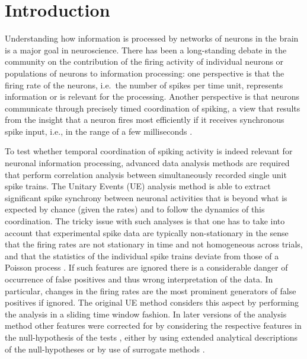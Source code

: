 \documentclass[10pt,a4paper,onecolumn]{article}
\begin{document}
\section{Introduction}\label{introduction}

Understanding how information is processed by networks of neurons in the
brain is a major goal in neuroscience. There has been a long-standing
debate in the community on the contribution of the firing activity of
individual neurons or populations of neurons to information processing:
one perspective is that the firing rate of the neurons, i.e.~the number
of spikes per time unit, represents information or is relevant for the
processing. Another perspective is that neurons communicate through
precisely timed coordination of spiking, a view that results from the
insight that a neuron fires most efficiently if it receives synchronous
spike input, i.e., in the range of a few milliseconds
\autocite{Abeles82}.

To test whether temporal coordination of spiking activity is indeed
relevant for neuronal information processing, advanced data analysis
methods are required that perform correlation analysis between
simultaneously recorded single unit spike trains. The Unitary Events
(UE) analysis method \autocites{GruenPhD}{Gruen99}{Gruen02a}{Gruen02b}
is able to extract significant spike synchrony between neuronal
activities that is beyond what is expected by chance (given the rates)
and to follow the dynamics of this coordination. The tricky issue with
such analyses is that one has to take into account that experimental
spike data are typically non-stationary in the sense that the firing
rates are not stationary in time and not homogeneous across trials, and
that the statistics of the individual spike trains deviate from those of
a Poisson process \autocites{Gruen09}{GruenRotter10_Chap10}. If such
features are ignored there is a considerable danger of occurrence of
false positives and thus wrong interpretation of the data. In
particular, changes in the firing rates are the most prominent
generators of false positives if ignored. The original UE method
considers this aspect by performing the analysis in a sliding time
window fashion. In later versions of the analysis method other features
were corrected for by considering the respective features in the
null-hypothesis of the tests
\autocites{Gruen03b}{Maldonado08}{Louis10}{Pipa2013}, either by using
extended analytical descriptions of the null-hypotheses or by use of
surrogate methods \autocites{Gruen09}{GruenRotter10_Chap10}{Louis10}.
\end{document}
